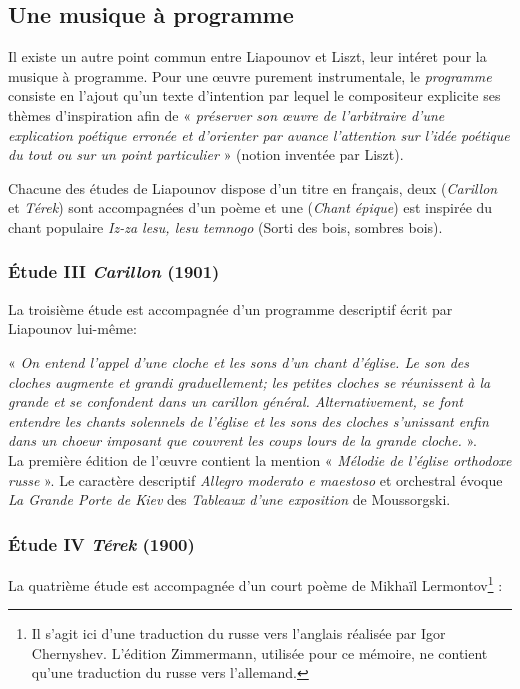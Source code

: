 \newpage

\subsection{Une musique à programme}

Il existe un autre point commun entre Liapounov et Liszt, leur intéret pour la musique à programme. Pour une œuvre purement instrumentale, le \emph{programme} consiste en l'ajout qu'un texte d'intention par lequel le compositeur explicite ses thèmes d'inspiration afin de « \emph{préserver son œuvre de l'arbitraire d'une explication poétique erronée et d'orienter par avance l'attention sur l'idée poétique du tout ou sur un point particulier} » (notion inventée par Liszt).

Chacune des études de Liapounov dispose d'un titre en français, deux (\emph{Carillon} et \emph{Térek}) sont accompagnées d'un poème et une (\emph{Chant épique}) est inspirée du chant populaire \emph{Iz-za lesu, lesu temnogo} (Sorti des bois, sombres bois).

\subsubsection{Étude III \emph{Carillon} (1901)}

La troisième étude est accompagnée d'un programme descriptif écrit par Liapounov lui-même:

« \emph{On entend l'appel d'une cloche et les sons d'un chant d'église. Le son des cloches augmente et grandi graduellement; les petites cloches se réunissent à la grande et se confondent dans un carillon général. Alternativement, se font entendre les chants solennels de l'église et les sons des cloches s’unissant enfin dans un choeur imposant que couvrent les coups lours de la grande cloche.} ».\\

La première édition de l'œuvre contient la mention « \emph{Mélodie de l’église orthodoxe russe} ». Le caractère descriptif \emph{Allegro moderato e maestoso} et orchestral évoque \emph{La Grande Porte de Kiev} des \emph{Tableaux d'une exposition} de Moussorgski.

\subsubsection{Étude IV \emph{Térek} (1900)}

La quatrième étude est accompagnée d'un court poème de Mikhaïl Lermontov\footnote{Il s'agit ici d'une traduction du russe vers l'anglais réalisée par Igor Chernyshev. L'édition Zimmermann, utilisée pour ce mémoire, ne contient qu'une traduction du russe vers l'allemand.} :

